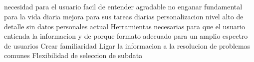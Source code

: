 \subsection*{}
necesidad para el usuario
facil de entender
agradable
no enganar
fundamental para la vida diaria
mejora para sus tareas diarias
personalizacion
nivel alto de detalle sin datos personales
actual
Herramientas necesarias para que el usuario entienda la informacion y de porque
formato adecuado para un amplio espectro de usuarios
Crear familiaridad
Ligar la informacion a la resolucion de problemas comunes
Flexibilidad de seleccion de subdata